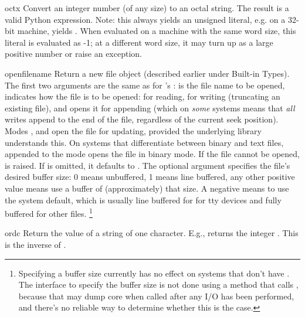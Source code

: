 \begin{funcdesc}{oct}{x}
  Convert an integer number (of any size) to an octal string.  The
  result is a valid Python expression.  Note: this always yields
  an unsigned literal, e.g. on a 32-bit machine,  yields
  .  When evaluated on a machine with the same
  word size, this literal is evaluated as -1; at a different word
  size, it may turn up as a large positive number or raise an
   exception.
\end{funcdesc}

\begin{funcdesc}{open}{filename}
  Return a new file object (described earlier under Built-in Types).
  The first two arguments are the same as for 's
  :  is the file name to be opened,
   indicates how the file is to be opened:  for
  reading,  for writing (truncating an existing file), and
   opens it for appending (which on {\em some} \UNIX{}
  systems means that {\em all} writes append to the end of the file,
  regardless of the current seek position).
  Modes ,  and
   open the file for updating, provided the underlying
   library understands this.  On systems that differentiate
  between binary and text files,  appended to the mode opens
  the file in binary mode.  If the file cannot be opened, 
  is raised.
If  is omitted, it defaults to .
The optional  argument specifies the file's desired
buffer size: 0 means unbuffered, 1 means line buffered, any other
positive value means use a buffer of (approximately) that size.  A
negative  means to use the system default, which is
usually line buffered for for tty devices and fully buffered for other
files.%
\footnote{Specifying a buffer size currently has no effect on systems
that don't have .  The interface to specify the buffer
size is not done using a method that calls , because
that may dump core when called after any I/O has been performed, and
there's no reliable way to determine whether this is the case.}
\end{funcdesc}

\begin{funcdesc}{ord}{c}
  Return the \ASCII{} value of a string of one character.  E.g.,
   returns the integer .  This is the inverse of
  .
\end{funcdesc}

